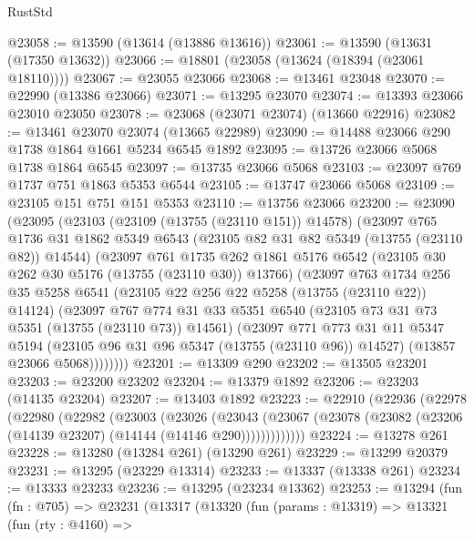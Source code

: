 \begin{lexlean}{RustStd}
\begin{coremodule}
@23058 := @13590 (@13614 (@13886 @13616))
@23061 := @13590 (@13631 (@17350 @13632))
@23066 := @18801 (@23058 (@13624 (@18394 (@23061 @18110))))
@23067 := @23055 @23066
@23068 := @13461 @23048
@23070 := @22990 (@13386 @23066)
@23071 := @13295 @23070
@23074 := @13393 @23066 @23010 @23050
@23078 := @23068 (@23071 @23074) (@13660 @22916)
@23082 := @13461 @23070 @23074 (@13665 @22989)
@23090 := @14488 @23066 @290 @1738 @1864 @1661 @5234 @6545 @1892
@23095 := @13726 @23066 @5068 @1738 @1864 @6545
@23097 := @13735 @23066 @5068
@23103 := @23097 @769 @1737 @751 @1863 @5353 @6544
@23105 := @13747 @23066 @5068
@23109 := @23105 @151 @751 @151 @5353
@23110 := @13756 @23066
@23200 := @23090
    (@23095
      (@23103
        (@23109 (@13755 (@23110 @151)) @14578)
        (@23097
          @765
          @1736
          @31
          @1862
          @5349
          @6543
          (@23105 @82 @31 @82 @5349 (@13755 (@23110 @82)) @14544)
          (@23097
            @761
            @1735
            @262
            @1861
            @5176
            @6542
            (@23105 @30 @262 @30 @5176 (@13755 (@23110 @30)) @13766)
            (@23097
              @763
              @1734
              @256
              @35
              @5258
              @6541
              (@23105 @22 @256 @22 @5258 (@13755 (@23110 @22)) @14124)
              (@23097
                @767
                @774
                @31
                @33
                @5351
                @6540
                (@23105 @73 @31 @73 @5351 (@13755 (@23110 @73)) @14561)
                (@23097
                  @771
                  @773
                  @31
                  @11
                  @5347
                  @5194
                  (@23105 @96 @31 @96 @5347 (@13755 (@23110 @96)) @14527)
                  (@13857 @23066 @5068))))))))
@23201 := @13309 @290
@23202 := @13505 @23201
@23203 := @23200 @23202
@23204 := @13379 @1892
@23206 := @23203 (@14135 @23204)
@23207 := @13403 @1892
@23223 := @22910
    (@22936
      (@22978
        (@22980
          (@22982
            (@23003
              (@23026
                (@23043
                  (@23067 (@23078 (@23082 (@23206 (@14139 @23207) (@14144 (@14146 @290)))))))))))))
@23224 := @13278 @261
@23228 := @13280 (@13284 @261) (@13290 @261)
@23229 := @13299 @20379
@23231 := @13295 (@23229 @13314)
@23233 := @13337 (@13338 @261)
@23234 := @13333 @23233
@23236 := @13295 (@23234 @13362)
@23253 := @13294
    (fun (fn : @705) =>
    @23231
      (@13317
        (@13320
          (fun (params : @13319) =>
          @13321
            (fun (rty : @4160) =>

\end{coremodule}
\end{lexlean}
